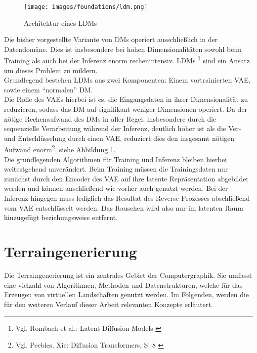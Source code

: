 \begin{figure}[ht]
    \centering
    \texttt{[image: images/foundations/ldm.png]} 
    \caption{Architektur eines \ac{LDM}s \cite{rombach2022high}}
    \label{fig:ldm}
\end{figure}
Die bisher vorgestellte Variante von \ac{DM}s operiert ausschließlich in der Datendomäne. Dies ist insbesondere bei hohen Dimensionalitäten sowohl beim Training als auch bei der Inferenz enorm rechenintensiv. \ac{LDM}s \footnote{
    Vgl. Rombach et al.: Latent Diffusion Models
    \cite{rombach2022high}
} sind ein Ansatz um dieses Problem zu mildern. \\
Grundlegend bestehen \ac{LDM}s aus zwei Komponenten: Einem vortrainierten \ac{VAE}, sowie einem \enquote{normalen} \ac{DM}. \\
Die Rolle des \ac{VAE}s hierbei ist es, die Eingangsdaten in ihrer Dimensionalität zu reduzieren, sodass das \ac{DM} auf signifikant weniger Dimensionen operiert. Da der nötige Rechenaufwand des \ac{DM}s in aller Regel, insbesondere durch die sequenzielle Verarbeitung während der Inferenz, deutlich höher ist als die Ver- und Entschlüsselung durch einen VAE, reduziert dies den insgesamt nötigen Aufwand enorm\footnote{
    Vgl. Peebles, Xie: Diffusion Transformers, S. 8
    \cite{peebles2023scalable}
}, siehe Abbildung \ref{fig:ldm}. \\
Die grundlegenden Algorithmen für Training und Inferenz bleiben hierbei weitestgehend unverändert. Beim Training müssen die Trainingsdaten nur zunächst durch den Encoder des \ac{VAE} auf ihre latente Repräsentation abgebildet werden und können anschließend wie vorher auch genutzt werden. Bei der Inferenz hingegen muss lediglich das Resultat des Reverse-Prozesses abschließend vom \ac{VAE} entschlüsselt werden. Das Rauschen wird also nur im latenten Raum hinzugefügt beziehungsweise entfernt.


\section{Terraingenerierung}

Die Terraingenerierung ist ein zentrales Gebiet der Computergraphik. Sie umfasst eine vielzahl von Algorithmen, Methoden und Datenstrukturen, welche für das Erzeugen von virtuellen Landschaften genutzt werden. Im Folgenden, werden die für den weiteren Verlauf dieser Arbeit relevanten Konzepte erläutert.

